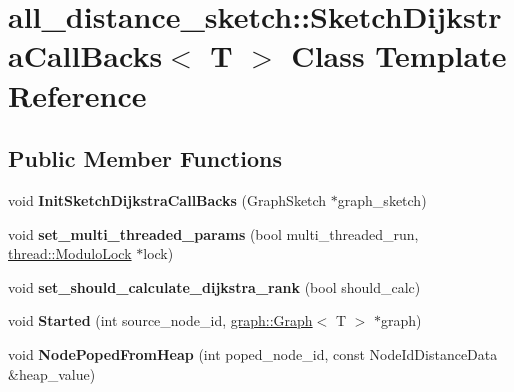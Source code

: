 \hypertarget{classall__distance__sketch_1_1SketchDijkstraCallBacks}{}\section{all\+\_\+distance\+\_\+sketch\+:\+:Sketch\+Dijkstra\+Call\+Backs$<$ T $>$ Class Template Reference}
\label{classall__distance__sketch_1_1SketchDijkstraCallBacks}
\subsection*{Public Member Functions}
\begin{DoxyCompactItemize}
\item 
\hypertarget{classall__distance__sketch_1_1SketchDijkstraCallBacks_a905dd3ea8dde187172a558497e211cf5}{}void {\bfseries Init\+Sketch\+Dijkstra\+Call\+Backs} (Graph\+Sketch $\ast$graph\+\_\+sketch)\label{classall__distance__sketch_1_1SketchDijkstraCallBacks_a905dd3ea8dde187172a558497e211cf5}

\item 
\hypertarget{classall__distance__sketch_1_1SketchDijkstraCallBacks_a239de43da37abfd780b1656d710d4446}{}void {\bfseries set\+\_\+multi\+\_\+threaded\+\_\+params} (bool multi\+\_\+threaded\+\_\+run, \hyperlink{classall__distance__sketch_1_1thread_1_1ModuloLock}{thread\+::\+Modulo\+Lock} $\ast$lock)\label{classall__distance__sketch_1_1SketchDijkstraCallBacks_a239de43da37abfd780b1656d710d4446}

\item 
\hypertarget{classall__distance__sketch_1_1SketchDijkstraCallBacks_ab418d3094d66ec3d76ef2069f4cdd526}{}void {\bfseries set\+\_\+should\+\_\+calculate\+\_\+dijkstra\+\_\+rank} (bool should\+\_\+calc)\label{classall__distance__sketch_1_1SketchDijkstraCallBacks_ab418d3094d66ec3d76ef2069f4cdd526}

\item 
\hypertarget{classall__distance__sketch_1_1SketchDijkstraCallBacks_af966bd041101276afee3eeaa36f2e946}{}void {\bfseries Started} (int source\+\_\+node\+\_\+id, \hyperlink{classall__distance__sketch_1_1graph_1_1Graph}{graph\+::\+Graph}$<$ T $>$ $\ast$graph)\label{classall__distance__sketch_1_1SketchDijkstraCallBacks_af966bd041101276afee3eeaa36f2e946}

\item 
\hypertarget{classall__distance__sketch_1_1SketchDijkstraCallBacks_aca2d55efff2b1b2ad8630987b013432b}{}void {\bfseries Node\+Poped\+From\+Heap} (int poped\+\_\+node\+\_\+id, const Node\+Id\+Distance\+Data \&heap\+\_\+value)\label{classall__distance__sketch_1_1SketchDijkstraCallBacks_aca2d55efff2b1b2ad8630987b013432b}


\end{DoxyCompactItemize}
